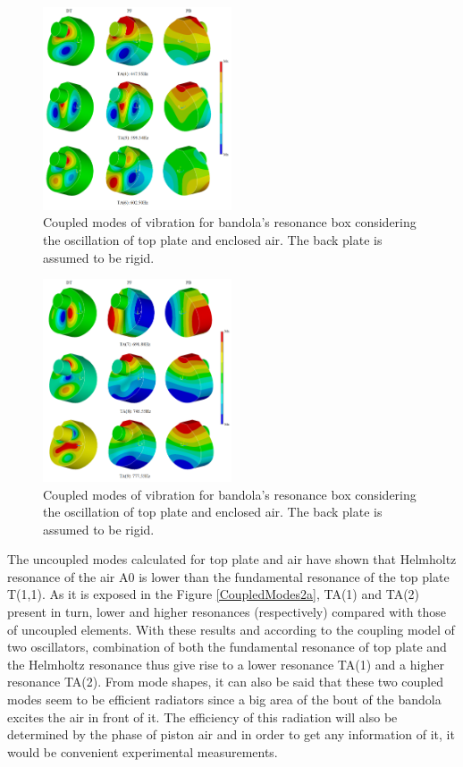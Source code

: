 \begin{figure}[h]
\centering
\includegraphics[height=6cm]{img/CoupledModes2b.png}
\caption{Coupled modes of vibration for bandola's resonance box considering the oscillation of top plate and enclosed air. The back plate is assumed to be rigid.}
\label{CoupledModes2b}
\end{figure}

\begin{figure}[h]
\centering
\includegraphics[height=6cm]{img/CoupledModes2c.png}
\caption{Coupled modes of vibration for bandola's resonance box considering the oscillation of top plate and enclosed air. The back plate is assumed to be rigid.}
\label{CoupledModes2c}
\end{figure}

The uncoupled modes calculated for top plate and air have shown that Helmholtz resonance of the air A0 is lower than the fundamental resonance of the top plate T(1,1). As it is exposed in the Figure \ref{CoupledModes2a}, TA(1) and TA(2) present in turn, lower and higher resonances (respectively) compared with those of uncoupled elements. With these results and according to the coupling model of two oscillators, combination of both the fundamental resonance of top plate and the Helmholtz resonance thus give rise to a lower resonance TA(1) and a higher resonance TA(2). From mode shapes, it can also be said that these two coupled modes seem to be efficient radiators since a big area of the bout of the bandola excites the air in front of it. The efficiency of this radiation will also be determined by the phase of piston air and in order to get any information of it, it would be convenient experimental measurements.

